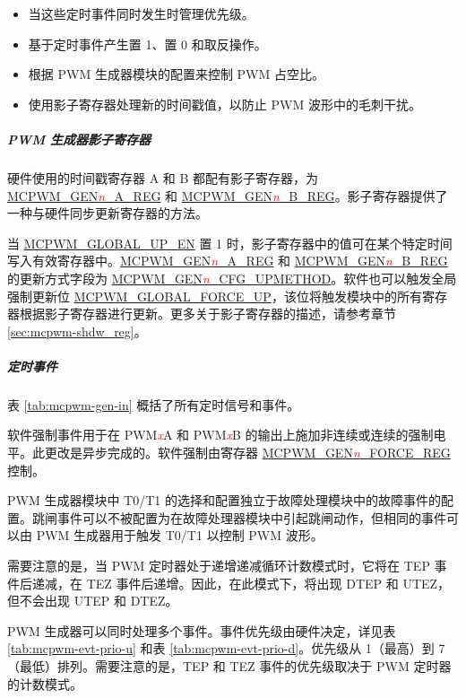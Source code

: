 \documentclass[main\_\_CN.tex]{subfiles}
\begin{document}
\begin{itemize}
\begin{itemize}
    \end{itemize}
    \item 当这些定时事件同时发生时管理优先级。
    \item 基于定时事件产生置 1、置 0 和取反操作。
    \item 根据 PWM 生成器模块的配置来控制 PWM 占空比。
    \item 使用影子寄存器处理新的时间戳值，以防止 PWM 波形中的毛刺干扰。
\end{itemize}

\subparagraph{PWM 生成器影子寄存器}
\label{subpara:mcpwm-op-shadow}
硬件使用的时间戳寄存器 A 和 B 都配有影子寄存器，为 \hyperref[regdesc:MCPWMGENNAREG]{MCPWM\_GEN\textcolor{red}{\it{n}}\_A\_REG} 和 \hyperref[regdesc:MCPWMGENNBREG]{MCPWM\_GEN\textcolor{red}{\it{n}}\_B\_REG}。影子寄存器提供了一种与硬件同步更新寄存器的方法。

当 \hyperref[fielddesc:MCPWMGLOBALUPEN]{MCPWM\_GLOBAL\_UP\_EN} 置 1 时，影子寄存器中的值可在某个特定时间写入有效寄存器中。\hyperref[regdesc:MCPWMGENNAREG]{MCPWM\_GEN\textcolor{red}{\it{n}}\_A\_REG} 和 \hyperref[regdesc:MCPWMGENNBREG]{MCPWM\_GEN\textcolor{red}{\it{n}}\_B\_REG} 的更新方式字段为 \hyperref[fielddesc:MCPWMGENNCFGUPMETHOD]{MCPWM\_GEN\textcolor{red}{\it{n}}\_CFG\_UPMETHOD}。软件也可以触发全局强制更新位 \hyperref[fielddesc:MCPWMGLOBALFORCEUP]{MCPWM\_GLOBAL\_FORCE\_UP}，该位将触发模块中的所有寄存器根据影子寄存器进行更新。更多关于影子寄存器的描述，请参考章节 \ref{sec:mcpwm-shdw_reg}。

\subparagraph{定时事件}
\label{subpara:mcpwm-op-evt}
表 \ref{tab:mcpwm-gen-in} 概括了所有定时信号和事件。



软件强制事件用于在 PWM\textcolor{red}{\it{x}}A 和 PWM\textcolor{red}{\it{x}}B 的输出上施加非连续或连续的强制电平。此更改是异步完成的。软件强制由寄存器 \hyperref[regdesc:MCPWMGENNFORCEREG]{MCPWM\_GEN\textcolor{red}{\it{n}}\_FORCE\_REG} 控制。

PWM 生成器模块中 T0/T1 的选择和配置独立于故障处理模块中的故障事件的配置。跳闸事件可以不被配置为在故障处理器模块中引起跳闸动作，但相同的事件可以由 PWM 生成器用于触发 T0/T1 以控制 PWM 波形。

需要注意的是，当 PWM 定时器处于递增递减循环计数模式时，它将在 TEP 事件后递减，在 TEZ 事件后递增。因此，在此模式下，将出现 DTEP 和 UTEZ，但不会出现 UTEP 和 DTEZ。

PWM 生成器可以同时处理多个事件。事件优先级由硬件决定，详见表 \ref{tab:mcpwm-evt-prio-u} 和表 \ref{tab:mcpwm-evt-prio-d}。优先级从 1（最高）到 7（最低）排列。需要注意的是，TEP 和 TEZ 事件的优先级取决于 PWM 定时器的计数模式。
\end{document}
